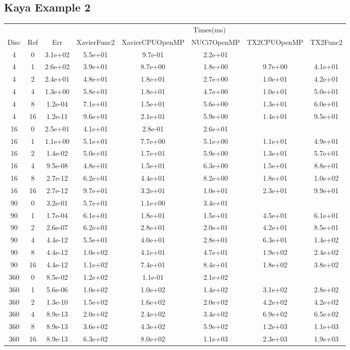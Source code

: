 \begin{landscape}
\subsection{Kaya Example 2}
\begin{center}
\begin{tabular}{c|c|c|c|c|c|c|c}
	&&&\multicolumn{5}{c}{Times(ms)}\\
	Disc&Ref&Err&XavierFunc2&XavierCPUOpenMP&NUCi7OpenMP&TX2CPUOpenMP&TX2Func2\\
\hline
4&0&3.1e+02&5.5e+01&9.7e-01&2.2e+01\\
4&1&2.6e+02&3.9e+01&8.7e+00&1.8e+00&9.7e+00&4.1e+01\\
4&2&2.4e+01&4.8e+01&1.8e+01&2.7e+00&1.0e+01&4.2e+01\\
4&4&1.3e+00&5.8e+01&1.8e+01&4.7e+00&1.0e+01&5.0e+01\\
4&8&1.2e-04&7.1e+01&1.5e+01&5.6e+00&1.3e+01&6.0e+01\\
4&16&1.2e-11&9.6e+01&2.1e+01&5.9e+00&1.4e+01&9.5e+01\\
\hline
16&0&2.5e+01&4.1e+01&2.8e-01&2.6e+01\\
16&1&1.1e+00&5.1e+01&7.7e+00&5.1e+00&1.1e+01&4.9e+01\\
16&2&1.4e-02&5.0e+01&1.7e+01&5.9e+00&1.3e+01&5.7e+01\\
16&4&9.5e-08&4.8e+01&1.5e+01&6.3e+00&1.5e+01&8.8e+01\\
16&8&2.7e-12&6.2e+01&4.4e+01&8.2e+00&1.8e+01&1.0e+02\\
16&16&2.7e-12&9.7e+01&3.2e+01&1.0e+01&2.3e+01&9.9e+01\\
\hline
90&0&3.2e-01&5.7e+01&1.1e+00&3.4e+01\\
90&1&1.7e-04&6.1e+01&1.8e+01&1.5e+01&4.5e+01&6.1e+01\\
90&2&2.6e-07&6.2e+01&2.8e+01&2.0e+01&4.2e+01&8.5e+01\\
90&4&4.4e-12&5.5e+01&4.0e+01&2.8e+01&6.3e+01&1.4e+02\\
90&8&4.4e-12&1.0e+02&4.1e+01&4.7e+01&1.9e+02&2.4e+02\\
90&16&4.4e-12&1.1e+02&7.4e+01&8.4e+01&1.8e+02&3.8e+02\\
\hline
360&0&8.5e-02&1.2e+02&1.1e-01&2.1e+02\\
360&1&5.6e-06&1.0e+02&1.0e+02&1.4e+02&3.1e+02&2.8e+02\\
360&2&1.3e-10&1.5e+02&1.6e+02&2.0e+02&4.2e+02&4.2e+02\\
360&4&8.9e-13&2.0e+02&2.4e+02&3.4e+02&6.9e+02&6.5e+02\\
360&8&8.9e-13&3.6e+02&4.3e+02&5.9e+02&1.2e+03&1.1e+03\\
360&16&8.9e-13&6.3e+02&8.0e+02&1.1e+03&2.3e+03&1.9e+03\\
\hline
\end{tabular}
\end{center}
\end{landscape}






